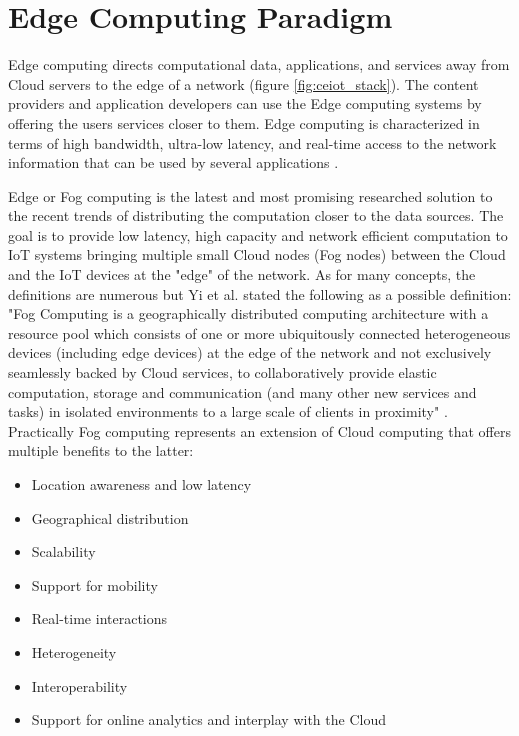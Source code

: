 
\section{Edge Computing Paradigm}
\label{Edge}
Edge computing directs computational data, applications, and services away from Cloud servers to the edge of a network (figure \ref{fig:ceiot_stack}). The content providers and application developers can use the Edge computing systems by offering the users services closer to them. Edge computing is characterized in terms of high bandwidth, ultra-low latency, and real-time access to the network information that can be used by several applications \cite{khan2019edge}.

Edge or Fog computing is the latest and most promising researched solution to the recent trends of distributing the computation closer to the data sources. The goal is to provide low latency, high capacity and network efficient computation to IoT systems bringing multiple small Cloud nodes (Fog nodes) between the Cloud and the IoT devices at the "edge" of the network. As for many concepts, the definitions are numerous \cite{sahni2018data} but Yi et al. stated the following as a possible definition: "Fog Computing is a geographically distributed computing architecture with a resource pool which consists of one or more ubiquitously connected heterogeneous devices (including edge devices) at the edge of the network and not exclusively seamlessly backed by Cloud services, to collaboratively provide elastic computation, storage and communication (and many other new services and tasks) in isolated environments to a large scale of clients in proximity" \cite{yi2015fog}.
Practically Fog computing represents an extension of Cloud computing that offers multiple benefits to the latter:

\begin{itemize}
    \item Location awareness and low latency
    \item Geographical distribution
    \item Scalability
    \item Support for mobility
    \item Real-time interactions
    \item Heterogeneity
    \item Interoperability
    \item Support for online analytics and interplay with the Cloud
\end{itemize}

